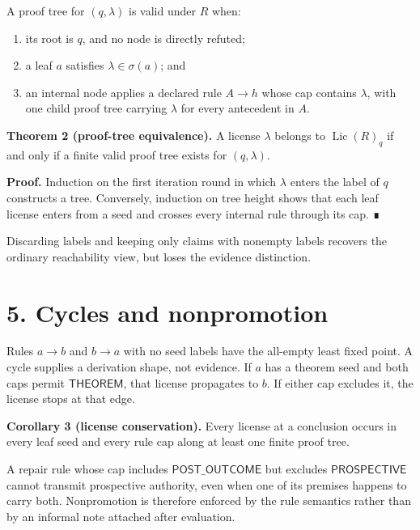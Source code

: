 \documentclass[
  11pt,
]{article}
\providecommand{\tightlist}{%
  \setlength{\itemsep}{0pt}\setlength{\parskip}{0pt}}
\begin{document}
A proof tree for \((q, \lambda)\) is valid under \(R\) when:

\begin{enumerate}
\def\labelenumi{\arabic{enumi}.}
\tightlist
\item
  its root is \(q\), and no node is directly refuted;
\item
  a leaf \(a\) satisfies \(\lambda\in\sigma(a)\); and
\item
  an internal node applies a declared rule \(A\to h\) whose cap contains
  \(\lambda\), with one child proof tree carrying \(\lambda\) for every
  antecedent in \(A\).
\end{enumerate}

\textbf{Theorem 2 (proof-tree equivalence).} A license \(\lambda\)
belongs to \(\operatorname{Lic}(R)_q\) if and only if a finite valid
proof tree exists for \((q, \lambda)\).

\textbf{Proof.} Induction on the first iteration round in which
\(\lambda\) enters the label of \(q\) constructs a tree. Conversely,
induction on tree height shows that each leaf license enters from a seed
and crosses every internal rule through its cap. ∎

Discarding labels and keeping only claims with nonempty labels recovers
the ordinary reachability view, but loses the evidence distinction.

\hypertarget{cycles-and-nonpromotion}{%
\section{5. Cycles and nonpromotion}\label{cycles-and-nonpromotion}}

Rules \(a\to b\) and \(b\to a\) with no seed labels have the all-empty
least fixed point. A cycle supplies a derivation shape, not evidence. If
\(a\) has a theorem seed and both caps permit \(\textsf{THEOREM}\), that
license propagates to \(b\). If either cap excludes it, the license
stops at that edge.

\textbf{Corollary 3 (license conservation).} Every license at a
conclusion occurs in every leaf seed and every rule cap along at least
one finite proof tree.

A repair rule whose cap includes \(\textsf{POST\_OUTCOME}\) but excludes
\(\textsf{PROSPECTIVE}\) cannot transmit prospective authority, even
when one of its premises happens to carry both. Nonpromotion is
therefore enforced by the rule semantics rather than by an informal note
attached after evaluation.
\end{document}
